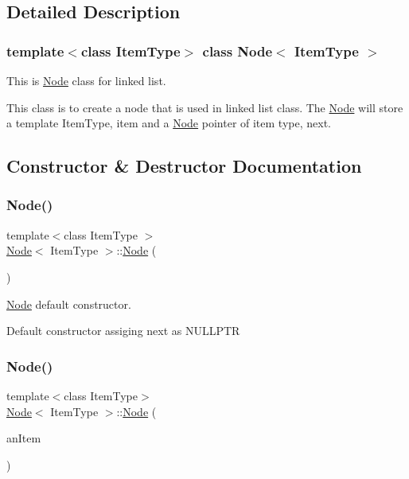 \subsection{Detailed Description}
\subsubsection*{template$<$class Item\+Type$>$\newline
class Node$<$ Item\+Type $>$}

This is \hyperlink{classNode}{Node} class for linked list. 

This class is to create a node that is used in linked list class. The \hyperlink{classNode}{Node} will store a template Item\+Type, item and a \hyperlink{classNode}{Node} pointer of item type, next. 

\subsection{Constructor \& Destructor Documentation}
\mbox{\label{classNode_a627e94f4fba0e73c546e0fb2a7266f36}} 
\subsubsection{\texorpdfstring{Node()}{Node()}\hspace{0.1cm}{\footnotesize\ttfamily [1/3]}}
{\footnotesize\ttfamily template$<$class Item\+Type $>$ \\
\hyperlink{classNode}{Node}$<$ Item\+Type $>$\+::\hyperlink{classNode}{Node} (\begin{DoxyParamCaption}{ }\end{DoxyParamCaption})}



\hyperlink{classNode}{Node} default constructor. 

Default constructor assiging next as N\+U\+L\+L\+P\+TR \mbox{\label{classNode_a0288598fcb0244739ce95099c26250ae}} 
\subsubsection{\texorpdfstring{Node()}{Node()}\hspace{0.1cm}{\footnotesize\ttfamily [2/3]}}
{\footnotesize\ttfamily template$<$class Item\+Type$>$ \\
\hyperlink{classNode}{Node}$<$ Item\+Type $>$\+::\hyperlink{classNode}{Node} (\begin{DoxyParamCaption}\item[{const Item\+Type \&}]{an\+Item }\end{DoxyParamCaption})}



